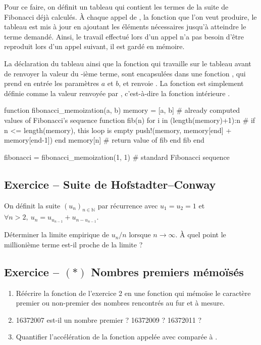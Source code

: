\documentclass{article}
\newcounter{loop}
\newcounter{numEx}
\newcommand{\exo}[1]{
	\stepcounter{numEx}
	\setcounter{loop}{0}
	\subsection*{Exercice \arabic{numEx} -- #1}
}
\newcommand{\seq}[3]{\ensuremath{\left(#1_{#2}\right)_{#2\in#3}}}
\newcommand{\N}{\mathbb{N}}
\newenvironment{repl}{\vspace{-0.6em}\VerbatimEnvironment\begin{jlrepl}}{\end{jlrepl}}
\begin{document}
Pour ce faire, on définit un tableau  qui contient les termes de la suite de Fibonacci déjà calculés. À chaque appel de , la fonction que l'on veut produire, le tableau est mis à jour en ajoutant les éléments nécessaires jusqu'à atteindre le terme  demandé. Ainsi, le travail effectué lors d'un appel n'a pas besoin d'être reproduit lors d'un appel suivant, il est gardé en mémoire.

La déclaration du tableau  ainsi que la fonction  qui travaille sur le tableau avant de renvoyer la valeur du -ième terme, sont encapsulées dans une fonction , qui prend en entrée les paramètres $a$ et $b$, et renvoie . La fonction  est simplement définie comme la valeur renvoyée par , c'est-à-dire la fonction intérieure .\vspace{0.5em}

\begin{repl}
function fibonacci_memoization(a, b)
    memory = [a, b] # already computed values of Fibonacci's sequence
    function fib(n)
        for i in (length(memory)+1):n # if n <= length(memory), this loop is empty
            push!(memory, memory[end] + memory[end-1])
        end
        memory[n] # return value of fib
    end
    fib
end

fibonacci = fibonacci_memoization(1, 1) # standard Fibonacci sequence
\end{repl}

\exo{Suite de Hofstadter--Conway}

On définit la suite $\seq un\N$ par récurrence avec $u_1 = u_2 = 1$ et $\forall n>2,\ u_n = u_{u_{n-1}} + u_{n - u_{n-1}}$.

Déterminer la limite empirique de $u_n/n$ lorsque $n\to\infty$. À quel point le millionième terme est-il proche de la limite ?

\exo{$(*)$ Nombres premiers mémoïsés}

\begin{enumerate}
	\item Réécrire la fonction  de l'exercice 2 en une fonction  qui mémoïse le caractère premier ou non-premier des nombres rencontrés au fur et à mesure. 

	\item 16372007 est-il un nombre premier ? 16372009 ? 16372011 ?

	\item Quantifier l'accélération de la fonction  appelée avec  comparée à .
\end{enumerate}
\end{document}
